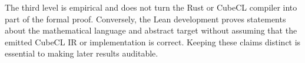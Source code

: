 The third level is empirical and does not turn the Rust or CubeCL compiler into
part of the formal proof.  Conversely, the Lean development proves statements
about the mathematical language and abstract target without assuming that the
emitted CubeCL IR or implementation is correct.  Keeping these claims distinct
is essential to making later results auditable.
